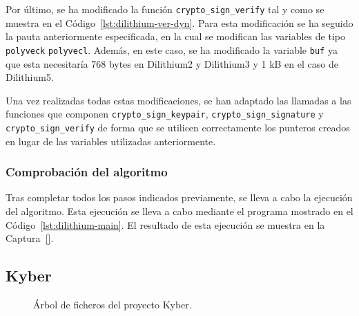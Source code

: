 Por último, se ha modificado la función \texttt{crypto\_sign\_verify} tal y como se muestra en el Código~\ref{lst:dilithium-ver-dyn}.
Para esta modificación se ha seguido la pauta anteriormente especificada, en la cual se modifican las variables de tipo \texttt{polyveck} \texttt{polyvecl}.
Además, en este caso, se ha modificado la variable \texttt{buf} ya que esta necesitaría 768 bytes en Dilithium2 y Dilithium3 y 1 kB en el caso de Dilithium5.

Una vez realizadas todas estas modificaciones, se han adaptado las llamadas a las funciones que componen \texttt{crypto\_sign\_keypair}, \texttt{crypto\_sign\_signature} y \texttt{crypto\_sign\_verify} de forma que se utilicen correctamente los punteros creados en lugar de las variables utilizadas anteriormente.


\subsubsection{Comprobación del algoritmo}\label{subsubsec:dilithium-compro}

Tras completar todos los pasos indicados previamente, se lleva a cabo la ejecución del algoritmo.
Esta ejecución se lleva a cabo mediante el programa mostrado en el Código~\ref{lst:dilithium-main}.
El resultado de esta ejecución se muestra en la Captura~\ref{}.




\subsection{Kyber}\label{subsec:kyber}

\begin{figure}[H]
\centering
{}
\caption{Árbol de ficheros del proyecto Kyber.}
\label{tree:kyber}
\end{figure}

